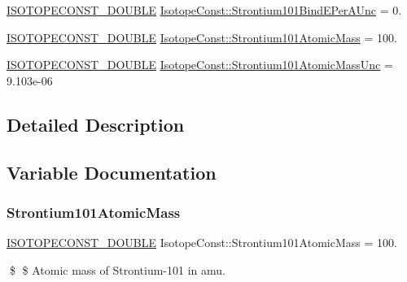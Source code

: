 \begin{DoxyCompactItemize}
\mbox{\hyperlink{group___isotope_const-_macros_ga8f45a7272ce02c0b4c65c44636ed719a}{I\+S\+O\+T\+O\+P\+E\+C\+O\+N\+S\+T\+\_\+\+D\+O\+U\+B\+LE}} \mbox{\hyperlink{group___isotope_const-_strontium-_sr101_ga81cfa3a73f4a31c59e7548caceca7acf}{Isotope\+Const\+::\+Strontium101\+Bind\+E\+Per\+A\+Unc}} = 0.
\item 
\mbox{\hyperlink{group___isotope_const-_macros_ga8f45a7272ce02c0b4c65c44636ed719a}{I\+S\+O\+T\+O\+P\+E\+C\+O\+N\+S\+T\+\_\+\+D\+O\+U\+B\+LE}} \mbox{\hyperlink{group___isotope_const-_strontium-_sr101_ga98517b9ec8794cf03fba6f49e7b073ab}{Isotope\+Const\+::\+Strontium101\+Atomic\+Mass}} = 100.
\item 
\mbox{\hyperlink{group___isotope_const-_macros_ga8f45a7272ce02c0b4c65c44636ed719a}{I\+S\+O\+T\+O\+P\+E\+C\+O\+N\+S\+T\+\_\+\+D\+O\+U\+B\+LE}} \mbox{\hyperlink{group___isotope_const-_strontium-_sr101_gad188f23638da1828510520de6f1bc677}{Isotope\+Const\+::\+Strontium101\+Atomic\+Mass\+Unc}} = 9.\+103e-\/06
\end{DoxyCompactItemize}


\subsection{Detailed Description}


\subsection{Variable Documentation}
\mbox{\label{group___isotope_const-_strontium-_sr101_ga98517b9ec8794cf03fba6f49e7b073ab}} 
\subsubsection{\texorpdfstring{Strontium101\+Atomic\+Mass}{Strontium101AtomicMass}}
{\footnotesize\ttfamily \mbox{\hyperlink{group___isotope_const-_macros_ga8f45a7272ce02c0b4c65c44636ed719a}{I\+S\+O\+T\+O\+P\+E\+C\+O\+N\+S\+T\+\_\+\+D\+O\+U\+B\+LE}} Isotope\+Const\+::\+Strontium101\+Atomic\+Mass = 100.}

\$ \$ Atomic mass of Strontium-\/101 in amu. \mbox{\label{group___isotope_const-_strontium-_sr101_gad188f23638da1828510520de6f1bc677}} 
